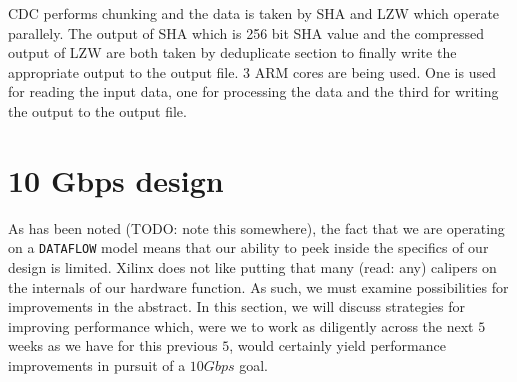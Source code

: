 \documentclass{article}
\begin{document}
CDC performs chunking and the data is taken by SHA and LZW which operate parallely. The output of SHA which is 256 bit SHA value and the compressed output of LZW are both taken by deduplicate section to finally write the appropriate output to the output file. 
3 ARM cores are being used. One is used for reading the input data, one for processing the data and the third for writing the output to the output file.  


\section{10 Gbps design}

As has been noted (TODO: note this somewhere), the fact that we are operating on a \texttt{DATAFLOW} model means that our ability to peek inside the specifics of our design is limited. Xilinx does not like putting that many (read: any) calipers on the internals of our hardware function.\newline
As such, we must examine possibilities for improvements in the abstract. In this section, we will discuss strategies for improving performance which, were we to work as diligently across the next $5$ weeks as we have for this previous $5$, would certainly yield performance improvements in pursuit of a $10Gbps$ goal.
\newline\newline
\end{document}
